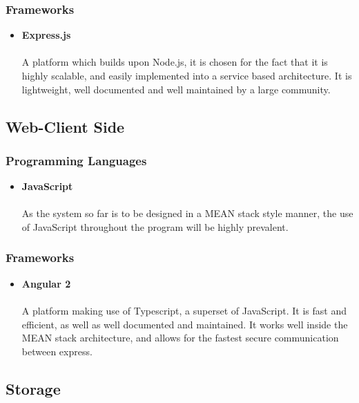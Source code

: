 \documentclass[12pt]{article}
\begin{document}
		\subsubsection{Frameworks}
		
		\begin{itemize}
			\item \textbf{Express.js}\\\\
			A platform which builds upon Node.js, it is chosen for the fact that it is highly scalable, and easily implemented into a service based architecture. It is lightweight, well documented and well maintained by a large community.
		\end{itemize}
	
	\subsection{Web-Client Side}
	
		\subsubsection{Programming Languages}
		
		\begin{itemize}
			\item \textbf{JavaScript}\\\\
			As the system so far is to be designed in a MEAN stack style manner, the use of JavaScript throughout the program will be highly prevalent.
		\end{itemize}
		
		\subsubsection{Frameworks}
		
		\begin{itemize}
			\item \textbf{Angular 2}\\\\
			A platform making use of Typescript, a superset of JavaScript. It is fast and efficient, as well as well documented and maintained. It works well inside the MEAN stack architecture, and allows for the fastest secure communication between express.
		\end{itemize}

	\subsection{Storage}
	
\end{document}
